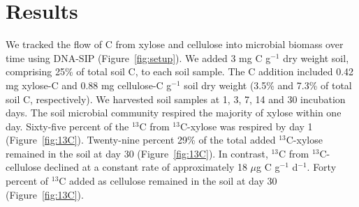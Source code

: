 \section{Results}
We tracked the flow of C from xylose and cellulose into microbial biomass over
time using DNA-SIP (Figure~\ref{fig:setup}). We added 3 mg C g$^{-1}$ dry
weight soil, comprising 25\% of total soil C, to each soil sample. The C
addition included 0.42 mg xylose-C and 0.88 mg cellulose-C g$^{-1}$ soil
dry weight (3.5\% and 7.3\% of total soil C, respectively). We harvested
soil samples at 1, 3, 7, 14 and 30 incubation days. The soil microbial
community respired the majority of xylose within one day. Sixty-five percent of
the $^{13}$C from $^{13}$C-xylose was respired by day 1 (Figure~\ref{fig:13C}).
Twenty-nine percent 29\% of the total added $^{13}$C-xylose remained in the
soil at day 30 (Figure~\ref{fig:13C}). In contrast, $^{13}$C from
$^{13}$C-cellulose declined at a constant rate of approximately 18 $\mu$g
C g$^{-1}$ d$^{-1}$. Forty percent of $^{13}$C added as cellulose remained in
the soil at day 30 (Figure~\ref{fig:13C}). 

